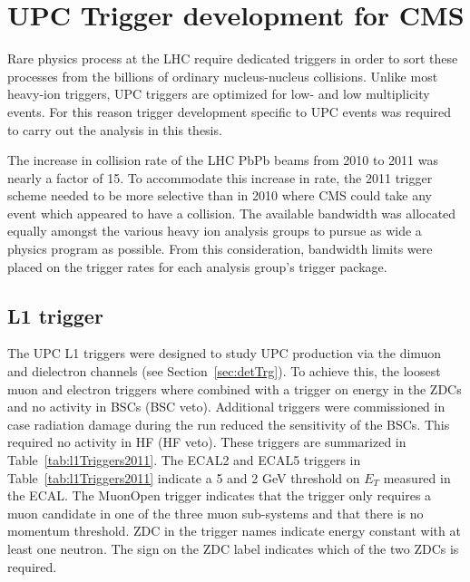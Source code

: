 \chapter{\label{ch:trigg}UPC Trigger development for CMS}
  Rare physics process at the LHC require dedicated triggers in order to sort
    these processes from the billions of ordinary nucleus-nucleus collisions. 
  Unlike most heavy-ion triggers, UPC triggers are optimized for low-\pt{} 
    and low multiplicity events. 
  For this reason trigger development specific to UPC events was required to
    carry out the analysis in this thesis.

  The increase in collision rate of the LHC PbPb beams from 2010 to 2011 was
    nearly a factor of 15. 
  To accommodate this increase in rate, the 2011 trigger scheme needed to be 
    more selective than in 2010 where CMS could take any event which 
    appeared to have a collision.
  The available bandwidth was allocated equally amongst the various heavy ion
    analysis groups to pursue as wide a physics program as possible.
  From this consideration, bandwidth limits were placed on the trigger rates
    for each analysis group's trigger package. 
  
  \section{\label{sec:l1Trigger}L1 trigger}
    The UPC L1 triggers were designed to study UPC \JPsi{} production via the 
      dimuon and dielectron channels (see Section~\ref{sec:detTrg}).
    To achieve this, the loosest muon and electron triggers where combined with
      a trigger on energy in the ZDCs and no activity in BSCs (BSC veto).
    Additional triggers were commissioned in case radiation damage during the 
      run reduced the sensitivity of the BSCs.
    This required no activity in HF (HF veto). 
    These triggers are summarized in Table~\ref{tab:l1Triggers2011}.
    The ECAL2 and ECAL5 triggers in Table~\ref{tab:l1Triggers2011}
      indicate a 5 and 2 GeV threshold on $E_{T}$ measured in the ECAL.
    The MuonOpen trigger indicates that the trigger only 
      requires a muon candidate in one of the three muon sub-systems and that
      there is no momentum threshold.
    ZDC in the trigger names indicate energy constant with at least one neutron.
    The sign on the ZDC label indicates which of the two ZDCs is required. 

